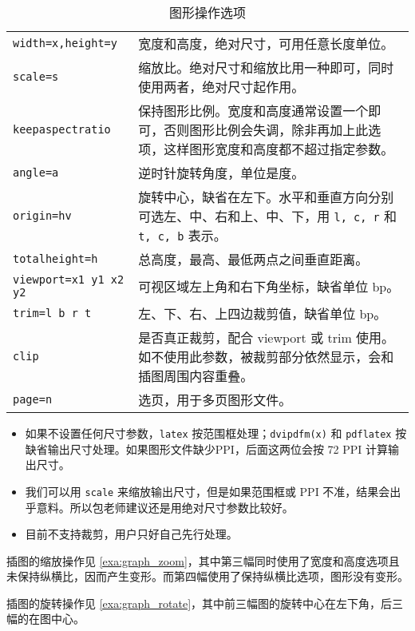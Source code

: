 \begin{table}[htbp]
\caption{图形操作选项}
\label{tab:graph_options}
\centering
\begin{tabularx}{\textwidth}{lX}
  \toprule
  \texttt{width=x,height=y} & 宽度和高度，绝对尺寸，可用任意长度单位。\\
  \texttt{scale=s} & 缩放比。绝对尺寸和缩放比用一种即可，同时使用两者，绝对尺寸起作用。\\
  \texttt{keepaspectratio} & 保持图形比例。宽度和高度通常设置一个即可，否则图形比例会失调，除非再加上此选项，这样图形宽度和高度都不超过指定参数。\\
  \texttt{angle=a} & 逆时针旋转角度，单位是度。\\
  \texttt{origin=hv} & 旋转中心，缺省在左下。水平和垂直方向分别可选左、中、右和上、中、下，用 \texttt{l, c, r} 和 \texttt{t, c, b} 表示。\\
  \texttt{totalheight=h} & 总高度，最高、最低两点之间垂直距离。\\
  \texttt{viewport=x1 y1 x2 y2} & 可视区域左上角和右下角坐标，缺省单位 bp。\\
  \texttt{trim=l b r t} & 左、下、右、上四边裁剪值，缺省单位 bp。\\
  \texttt{clip} & 是否真正裁剪，配合 viewport 或 trim 使用。如不使用此参数，被裁剪部分依然显示，会和插图周围内容重叠。\\
  \texttt{page=n} & 选页，用于多页图形文件。\\
  \bottomrule
\end{tabularx}
\end{table}

\begin{itemize}
  \item 如果不设置任何尺寸参数，\texttt{latex} 按范围框处理；\texttt{dvipdfm(x)} 和 \texttt{pdflatex} 按缺省输出尺寸处理。如果图形文件缺少PPI，后面这两位会按 72 PPI 计算输出尺寸。
  \item 我们可以用 \texttt{scale} 来缩放输出尺寸，但是如果范围框或 PPI 不准，结果会出乎意料。所以包老师建议还是用绝对尺寸参数比较好。
  \item \XeTeX 目前不支持裁剪，用户只好自己先行处理。
\end{itemize}
  
插图的缩放操作见 \autoref{exa:graph_zoom}，其中第三幅同时使用了宽度和高度选项且未保持纵横比，因而产生变形。而第四幅使用了保持纵横比选项，图形没有变形。

插图的旋转操作见 \autoref{exa:graph_rotate}，其中前三幅图的旋转中心在左下角，后三幅的在图中心。

